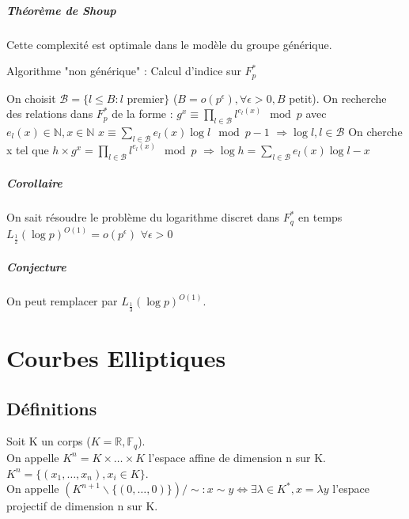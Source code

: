 \documentclass[12pt,a4paper]{report}
\begin{document}
\paragraph{Théorème de Shoup\\}
Cette complexité est optimale dans le modèle du groupe générique.
\begin{algorithm}
\caption{Algorithme "non générique" : Calcul d'indice sur $ F_p^*$}
\begin{algorithmic}
\STATE On choisit $\mathcal{B}=\{l \leqslant B : l $ premier$ \}$ ($B=o(p^\epsilon), \forall \epsilon > 0, B $ petit).
\STATE On recherche des relations dans $  F_p^*$ de la forme :
\STATE $\displaystyle g^x \equiv \prod_{l \in \mathcal{B}} l^{e_l(x)} \mod{p} $ avec $ e_l(x) \in \mathbb{N}, x \in \mathbb{N} $
\STATE $ \displaystyle x  \equiv \sum_{l \in \mathcal{B}} e_l(x) \log{l} \mod{p-1} $
\STATE $\displaystyle \Longrightarrow \log{l}, l \in \mathcal{B} $
\STATE On cherche x tel que $ \displaystyle h\times g^x = \prod_{l \in \mathcal{B}} l^{e_l(x)} \mod{p} $
\STATE $ \displaystyle \Longrightarrow \log{h} = \sum_{l \in \mathcal{B}} e_l(x) \log{l} -x $
\end{algorithmic}
\end{algorithm}
\paragraph{Corollaire\\}
On sait résoudre le problème du logarithme discret dans $F_q^*$ en temps $ L_{\frac{1}{2}}(\log{p})^{O(1)} = o(p^\epsilon) $ $ \forall \epsilon > 0$
\paragraph{Conjecture\\}
On peut remplacer par $ L_{\frac{1}{3}}(\log{p})^{O(1)} $.
\chapter{Courbes Elliptiques}
\section{Définitions}
Soit K un corps ($K=\mathbb{R}, \mathbb{F}_q$).\\
On appelle $K^n=K\times \ldots \times K$ l'espace affine de dimension n sur K. \\$ K^n=\{(x_1,\ldots,x_n),x_i \in K\}$.\\
On appelle $(K^{n+1}  \backslash \{(0,\ldots,0)\})/\sim:x\sim y \Leftrightarrow \exists \lambda \in K^*, x= \lambda y $ l'espace projectif de dimension n sur K.
\end{document}
